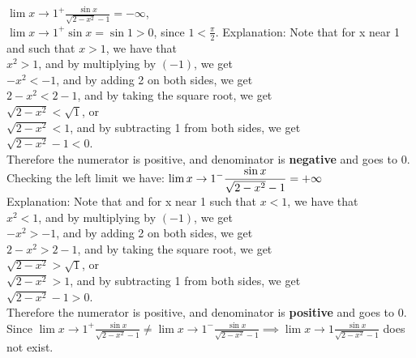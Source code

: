 \documentclass{ximera}
\begin{document}
\begin{problem}
\begin{enumerate}
\begin{explanation}
         $ \displaystyle \lim{x \to 1^+} \frac{\sin{x}}{\sqrt{2-x^{2}}-1}= -\infty$,\\[1em]
        $ \displaystyle \lim{x \to 1^+} \sin{x}=\sin{1}>0$, since $1<\frac{\pi}{2}$.
     Explanation: Note that for x near 1 and such that $x>1$, we have that \\[1em]
      $x^{2}>1$,    and by multiplying by $(-1)$, we get\\[1em]
  $ - x^{2}<-1$,   and by adding 2 on both sides, we get\\[1em]
   $2 - x^{2}<2-1$, and by taking the square root, we get\\[1em]
   $ \sqrt{2 - x^{2}}<\sqrt{1}$, or\\[1em]
      $\sqrt{2 - x^{2}}<1$, and by subtracting 1 from both sides, we get\\[1em]
        $ \sqrt{2 - x^{2}}-1<0$. \\[1em] Therefore the numerator is positive, and denominator is \textbf{negative} and goes to 0.\\[1em]

 	 Checking the left limit we have:
      $\displaystyle \displaystyle \lim{x \to 1^{-}} \frac{\sin{x}}{\sqrt{2-x^{2}}-1}=+\infty$\\[1em]
      
     Explanation: Note that and for x near 1 such that  $x<1$, we have that\\[1em]
       
      $x^{2}<1$,    and by multiplying by $(-1)$, we get\\[1em]
  $ - x^{2}>-1$,   and by adding 2 on both sides, we get\\[1em]
   $2 - x^{2}>2-1$, and by taking the square root, we get\\[1em]
   $ \sqrt{2 - x^{2}}>\sqrt{1}$, or\\[1em]
      $\sqrt{2 - x^{2}}>1$, and by subtracting 1 from both sides, we get\\[1em]
        $ \sqrt{2 - x^{2}}-1>0$.\\[1em] Therefore the numerator is positive, and denominator is \textbf{positive} and goes to 0.\\[1em]
        
      	Since $ \displaystyle \lim{x \to 1^+}  \frac{\sin{x}}{\sqrt{2-x^{2}}-1} \ne \displaystyle \lim{x \to 1^-} \frac{\sin{x}}{\sqrt{2-x^{2}}-1} \implies   \displaystyle \lim{x \to 1}  \frac{\sin{x}}{\sqrt{2-x^{2}}-1}$ does not exist.
      \end{explanation}
\end{enumerate}
\end{problem}
\end{document}
